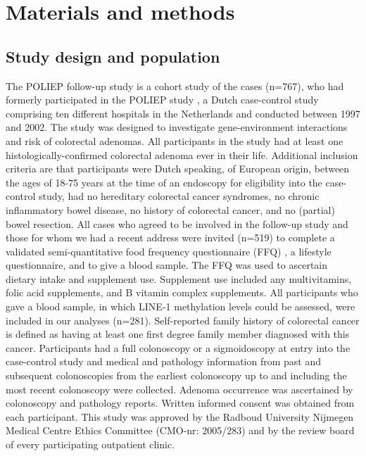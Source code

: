 \section{Materials and methods} %
\subsection{Study design and population} %
\noindent The POLIEP follow-up study is a cohort study of the cases (n=767), who had formerly participated in the POLIEP study \cite{c543}, a Dutch case-control study comprising ten different hospitals in the Netherlands and conducted between 1997 and 2002. The study was designed to investigate gene-environment interactions and risk of colorectal adenomas. All participants in the study had at least one histologically-confirmed colorectal adenoma ever in their life. Additional inclusion criteria are that participants were Dutch speaking, of European origin, between the ages of 18-75 years at the time of an endoscopy for eligibility into the case-control study, had no hereditary colorectal cancer syndromes, no chronic inflammatory bowel disease, no history of colorectal cancer, and no (partial) bowel resection. All cases who agreed to be involved in the follow-up study and those for whom we had a recent address were invited (n=519) to complete a validated semi-quantitative food frequency questionnaire (FFQ) \cite{c544}, a lifestyle questionnaire, and to give a blood sample. The FFQ was used to ascertain dietary intake and supplement use. Supplement use included any multivitamins, folic acid supplements, and B vitamin complex supplements. All participants who gave a blood sample, in which LINE-1 methylation levels could be assessed, were included in our analyses (n=281). Self-reported family history of colorectal cancer is defined as having at least one first degree family member diagnosed with this cancer. Participants had a full colonoscopy or a sigmoidoscopy at entry into the case-control study and medical and pathology information from past and subsequent colonoscopies from the earliest colonoscopy up to and including the most recent colonoscopy were collected. Adenoma occurrence was ascertained by colonoscopy and pathology reports. Written informed consent was obtained from each participant. This study was approved by the Radboud University Nijmegen Medical Centre Ethics Committee (CMO-nr: 2005/283) and by the review board of every participating outpatient clinic.


